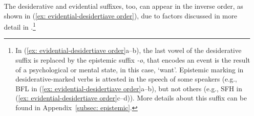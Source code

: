      \newpage
    \z
\z

The desiderative and evidential suffixes, too, can appear in the inverse order, as shown in (\ref{ex: evidential-desidertiave order}), due to factors discussed in more detail in \citet{caballero2010scope}.\footnote{In (\ref{ex: evidential-desidertiave order}a--b), the last vowel of the desiderative suffix is replaced by the epistemic suffix \textit{-o}, that encodes an event is the result of a psychological or mental state, in this case, `want'. Epistemic marking in desiderative-marked verbs is attested in the speech of some speakers (e.g., BFL in (\ref{ex: evidential-desidertiave order}a--b), but not others (e.g., SFH in (\ref{ex: evidential-desidertiave order}c--d)). More details about this suffix can be found in Appendix~\ref{subsec: epistemic}.}

